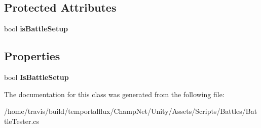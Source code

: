 \subsection*{Protected Attributes}
\begin{DoxyCompactItemize}
\item 
\hypertarget{class_battle_tester_a39cd5d1c4a86ae22eb25d9a6d6674db9}{bool {\bfseries is\-Battle\-Setup}}\label{class_battle_tester_a39cd5d1c4a86ae22eb25d9a6d6674db9}

\end{DoxyCompactItemize}
\subsection*{Properties}
\begin{DoxyCompactItemize}
\item 
\hypertarget{class_battle_tester_afb877324567ebd5ac0d4f5372006d0fa}{bool {\bfseries Is\-Battle\-Setup}}\label{class_battle_tester_afb877324567ebd5ac0d4f5372006d0fa}

\end{DoxyCompactItemize}


The documentation for this class was generated from the following file\-:\begin{DoxyCompactItemize}
\item 
/home/travis/build/temportalflux/\-Champ\-Net/\-Unity/\-Assets/\-Scripts/\-Battles/Battle\-Tester.\-cs\end{DoxyCompactItemize}
